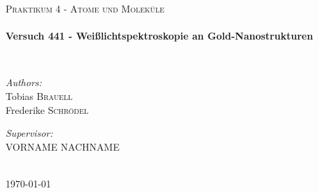 \begin{titlepage}
\begin{center}
    \textsc{\Large Praktikum 4 - Atome und Moleküle}\\[0.5 cm]

    \HRule \\[0.4 cm]
    { \huge \bfseries Versuch 441 - Weißlichtspektroskopie an Gold-Nanostrukturen \\[0.4 cm] }

    \HRule \\[1.5 cm]

    \noindent
    \begin{minipage}{0.4\textwidth}
      \begin{flushleft} \large
	\emph{Authors:}\\
	Tobias \textsc{Brauell}\\
	Frederike \textsc{Schrödel}
      \end{flushleft}
    \end{minipage}%
    \begin{minipage}{0.4\textwidth}
      \begin{flushright} \large
	\emph{Supervisor:} \\
	VORNAME \textsc{NACHNAME}
      \end{flushright}
    \end{minipage}

    \vfill

    \HRule \\[0.4 cm]
    {\large \today}

  \end{center}
\end{titlepage}